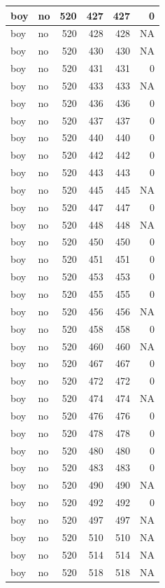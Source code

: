 \documentclass[man]{apa6}
\begin{document}
\begin{tabular}{l|l|r|r|r|r}
\hline
boy & no & 520 & 427 & 427 & 0\\
\hline
boy & no & 520 & 428 & 428 & NA\\
\hline
boy & no & 520 & 430 & 430 & NA\\
\hline
boy & no & 520 & 431 & 431 & 0\\
\hline
boy & no & 520 & 433 & 433 & NA\\
\hline
boy & no & 520 & 436 & 436 & 0\\
\hline
boy & no & 520 & 437 & 437 & 0\\
\hline
boy & no & 520 & 440 & 440 & 0\\
\hline
boy & no & 520 & 442 & 442 & 0\\
\hline
boy & no & 520 & 443 & 443 & 0\\
\hline
boy & no & 520 & 445 & 445 & NA\\
\hline
boy & no & 520 & 447 & 447 & 0\\
\hline
boy & no & 520 & 448 & 448 & NA\\
\hline
boy & no & 520 & 450 & 450 & 0\\
\hline
boy & no & 520 & 451 & 451 & 0\\
\hline
boy & no & 520 & 453 & 453 & 0\\
\hline
boy & no & 520 & 455 & 455 & 0\\
\hline
boy & no & 520 & 456 & 456 & NA\\
\hline
boy & no & 520 & 458 & 458 & 0\\
\hline
boy & no & 520 & 460 & 460 & NA\\
\hline
boy & no & 520 & 467 & 467 & 0\\
\hline
boy & no & 520 & 472 & 472 & 0\\
\hline
boy & no & 520 & 474 & 474 & NA\\
\hline
boy & no & 520 & 476 & 476 & 0\\
\hline
boy & no & 520 & 478 & 478 & 0\\
\hline
boy & no & 520 & 480 & 480 & 0\\
\hline
boy & no & 520 & 483 & 483 & 0\\
\hline
boy & no & 520 & 490 & 490 & NA\\
\hline
boy & no & 520 & 492 & 492 & 0\\
\hline
boy & no & 520 & 497 & 497 & NA\\
\hline
boy & no & 520 & 510 & 510 & NA\\
\hline
boy & no & 520 & 514 & 514 & NA\\
\hline
boy & no & 520 & 518 & 518 & NA\\

\end{tabular}
\end{document}
